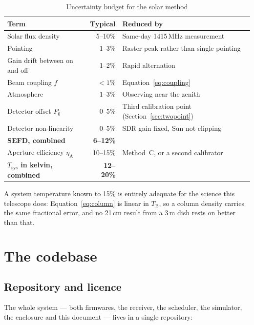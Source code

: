 \documentclass[11pt,a4paper]{article}
\begin{document}
\begin{table}[H]
\centering
\caption{Uncertainty budget for the solar method}
\label{tab:tsysuncertainty}
\small
\begin{tabular}{lrl}
\toprule
\textbf{Term} & \textbf{Typical} & \textbf{Reduced by} \\
\midrule
Solar flux density & 5--10\% & Same-day 1415\,MHz measurement \\
Pointing & 1--3\% & Raster peak rather than single pointing \\
Gain drift between on and off & 1--2\% & Rapid alternation \\
Beam coupling $f$ & $<1\%$ & Equation~\eqref{eq:coupling} \\
Atmosphere & 1--3\% & Observing near the zenith \\
Detector offset $P_0$ & 0--5\% & Third calibration point (Section~\ref{sec:twopoint}) \\
Detector non-linearity & 0--5\% & SDR gain fixed, Sun not clipping \\
\midrule
\textbf{SEFD, combined} & \textbf{6--12\%} & \\
Aperture efficiency $\eta_\text{A}$ & 10--15\% & Method~C, or a second calibrator \\
\textbf{$T_\text{sys}$ in kelvin, combined} & \textbf{12--20\%} & \\
\bottomrule
\end{tabular}
\end{table}

A system temperature known to 15\% is entirely adequate for the science this telescope does: Equation~\eqref{eq:column} is linear in $T_\text{B}$, so a column density carries the same fractional error, and no 21\,cm result from a 3\,m dish rests on better than that.

\section{The codebase}
\label{sec:codebase}

\subsection{Repository and licence}

The whole system --- both firmwares, the receiver, the scheduler, the simulator, the enclosure and this document --- lives in a single repository:
\end{document}
